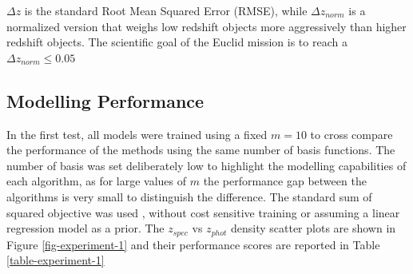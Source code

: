 \documentclass[useAMS,usenatbib,fleqn]{mn2e}
\begin{document}
$\Delta z$ is the standard Root Mean Squared Error (RMSE), while $\Delta z_{norm}$ is a normalized version that weighs low redshift objects more aggressively than higher redshift objects. The scientific goal of the Euclid mission is to reach a $\Delta z_{norm} \le 0.05$

\subsection{Modelling Performance}

In the first test, all models were trained using a fixed $m=10$ to cross compare the performance of the methods using the same number of basis functions. The number of basis was set deliberately low to highlight the modelling capabilities of each algorithm, as for large values of $m$ the performance gap between the algorithms is very small to distinguish the difference. The standard sum of squared objective was used , without cost sensitive training or assuming a linear regression model as a prior. The $z_{spec}$ vs $z_{phot}$ density scatter plots are shown in Figure \ref{fig-experiment-1} and their performance scores are reported in Table \ref{table-experiment-1}
\end{document}
